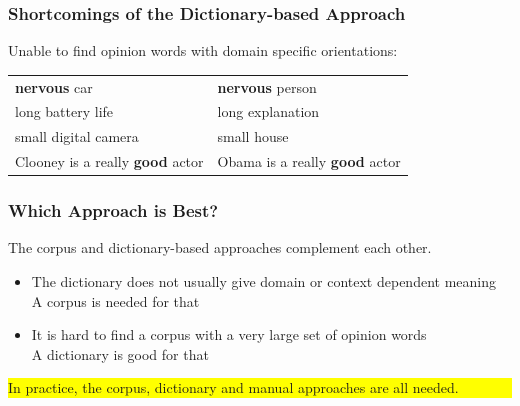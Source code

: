 \documentclass[t]{beamer}
\begin{document}
\begin{frame} \frametitle{Shortcomings of the Dictionary-based
    Approach} %

Unable to find opinion words with domain specific orientations:
\begin{center}
\begin{tabular}{ll}
\textbf{nervous} car  & \textbf{nervous} person \\
long battery life & long explanation \\
small digital camera & small house \\
Clooney is a really \textbf{good} actor  & Obama is a really \textbf{good} actor
\end{tabular}

\end{center}
\end{frame}

\begin{frame} \frametitle{Which Approach is Best?} %

The corpus and dictionary-based approaches complement each other.
\begin{itemize}
\item The dictionary does not usually give domain or context dependent meaning\\
A corpus is needed for that

\item It is hard to find a corpus with a very large set of opinion words \\
A dictionary is good for that
\end{itemize}

\colorbox{yellow}{\parbox{0.9 \textwidth} {
In practice, the corpus, dictionary and manual approaches are all needed.
}}

\end{frame}
\end{document}
